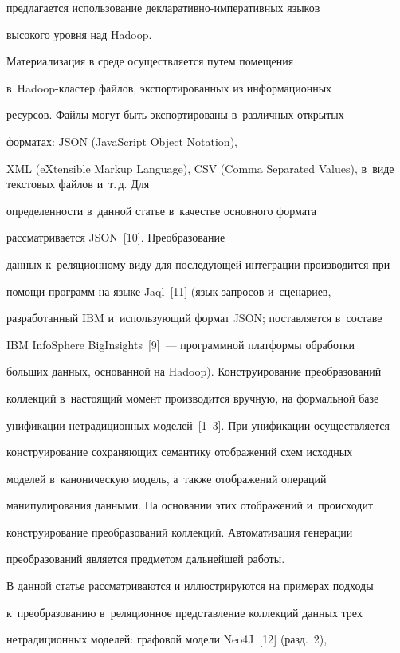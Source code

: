 предлагается использование декла\-ра\-тив\-но-им\-пе\-ра\-тив\-ных языков

высокого уровня над Hadoop.



    Материализация в среде осуществляется путем помещения

    в~Hadoop-клас\-тер файлов, экспортированных из информационных

ресурсов. Файлы могут быть экспортированы в~различных открытых

форматах: JSON (JavaScript Object Notation),

XML (eXtensible Markup Language), CSV (Comma Separated Values), в~виде текстовых файлов и~т.\,д. Для

определенности в~данной статье в~качестве основного формата

рассматривается JSON~[10]. Преобразование

данных к~реляционному виду для последующей интеграции производится при

помощи программ на языке Jaql~[11] (язык запросов и~сценариев,

разработанный IBM и~использующий формат JSON; поставляется в~составе

IBM InfoSphere \mbox{BigInsights}~[9]~--- про\-грам\-мной платформы обработки

больших данных, основанной на Hadoop). Конструирование преобразований

коллекций в~настоящий момент производится вручную, на формальной базе

унификации нетрадиционных моделей~[1--3]. При унификации осуществляется

конструирование сохраняющих семантику отображений схем исходных

моделей в~каноническую модель, а~так\-же отображений операций

манипулирования данными. На основании этих отображений и~происходит

конструирование преобразований коллекций. Автоматизация генерации

преобразований является предметом дальнейшей работы.



    В данной статье рассматриваются и иллюстрируются на примерах подходы

к~преобразованию в~реляционное представление коллекций данных трех

нетрадиционных моделей: графовой модели Neo4J~[12] (разд.~2),

